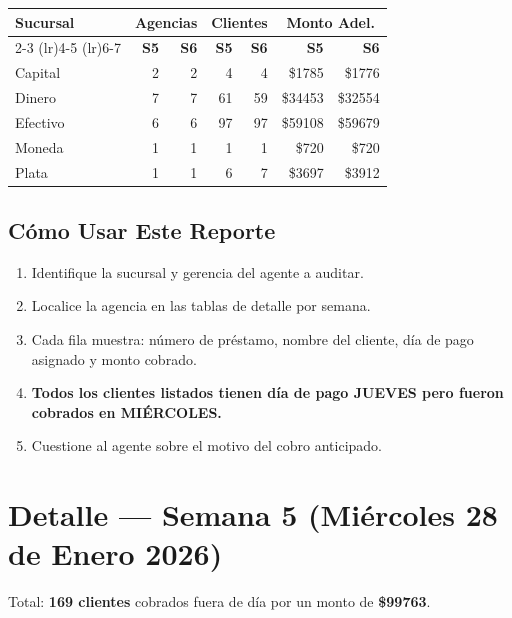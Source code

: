 \documentclass[11pt,a4paper]{article}
\newcommand{\money}[1]{\$\num{#1}}
\begin{document}
\begin{center}
\renewcommand{\arraystretch}{1.3}
\begin{tabular}{lrrrrrr}
\toprule
\textbf{Sucursal} & \multicolumn{2}{c}{\textbf{Agencias}} & \multicolumn{2}{c}{\textbf{Clientes}} & \multicolumn{2}{c}{\textbf{Monto Adel.}} \\
\cmidrule(lr){2-3} \cmidrule(lr){4-5} \cmidrule(lr){6-7}
& \textbf{S5} & \textbf{S6} & \textbf{S5} & \textbf{S6} & \textbf{S5} & \textbf{S6} \\
\midrule
Capital & 2 & 2 & 4 & 4 & \money{1785} & \money{1776} \\
Dinero & 7 & 7 & 61 & 59 & \money{34453} & \money{32554} \\
Efectivo & 6 & 6 & 97 & 97 & \money{59108} & \money{59679} \\
Moneda & 1 & 1 & 1 & 1 & \money{720} & \money{720} \\
Plata & 1 & 1 & 6 & 7 & \money{3697} & \money{3912} \\

\bottomrule
\end{tabular}
\end{center}

\subsection{C\'omo Usar Este Reporte}

\begin{enumerate}[leftmargin=2em]
  \item Identifique la sucursal y gerencia del agente a auditar.
  \item Localice la agencia en las tablas de detalle por semana.
  \item Cada fila muestra: n\'umero de pr\'estamo, nombre del cliente, d\'ia de pago asignado y monto cobrado.
  \item \textbf{Todos los clientes listados tienen d\'ia de pago JUEVES pero fueron cobrados en MI\'ERCOLES.}
  \item Cuestione al agente sobre el motivo del cobro anticipado.
\end{enumerate}

\newpage
\section{Detalle --- Semana 5 (Mi\'ercoles 28 de Enero 2026)}

Total: \textbf{169 clientes} cobrados fuera de d\'ia por un monto de \textbf{\money{99763}}.
\end{document}

